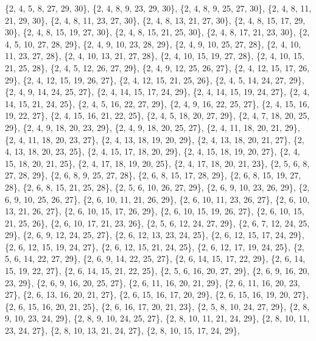 \documentclass[11pt,a4paper]{article}
\begin{document}
{\{2, 4, 5, 8, 27, 29, 30\}, \{2, 4, 8, 9, 23, 29, 30\}, \{2, 4, 8, 9, 25, 27, 30\}, \{2, 4, 8, 11, 21, 29, 30\}, \{2, 4, 8, 11, 23, 27, 30\},
\{2, 4, 8, 13, 21, 27, 30\}, \{2, 4, 8, 15, 17, 29, 30\}, \{2, 4, 8, 15, 19, 27, 30\}, \{2, 4, 8, 15, 21, 25, 30\}, \{2, 4, 8, 17, 21, 23, 30\},
\{2, 4, 5, 10, 27, 28, 29\}, \{2, 4, 9, 10, 23, 28, 29\}, \{2, 4, 9, 10, 25, 27, 28\}, \{2, 4, 10, 11, 23, 27, 28\}, \{2, 4, 10, 13, 21, 27, 28\},
\{2, 4, 10, 15, 19, 27, 28\}, \{2, 4, 10, 15, 21, 25, 28\}, \{2, 4, 5, 12, 26, 27, 29\}, \{2, 4, 9, 12, 25, 26, 27\}, \{2, 4, 12, 15, 17, 26, 29\},
\{2, 4, 12, 15, 19, 26, 27\}, \{2, 4, 12, 15, 21, 25, 26\}, \{2, 4, 5, 14, 24, 27, 29\}, \{2, 4, 9, 14, 24, 25, 27\}, \{2, 4, 14, 15, 17, 24, 29\},
\{2, 4, 14, 15, 19, 24, 27\}, \{2, 4, 14, 15, 21, 24, 25\}, \{2, 4, 5, 16, 22, 27, 29\}, \{2, 4, 9, 16, 22, 25, 27\}, \{2, 4, 15, 16, 19, 22, 27\},
\{2, 4, 15, 16, 21, 22, 25\}, \{2, 4, 5, 18, 20, 27, 29\}, \{2, 4, 7, 18, 20, 25, 29\}, \{2, 4, 9, 18, 20, 23, 29\}, \{2, 4, 9, 18, 20, 25, 27\},
\{2, 4, 11, 18, 20, 21, 29\}, \{2, 4, 11, 18, 20, 23, 27\}, \{2, 4, 13, 18, 19, 20, 29\}, \{2, 4, 13, 18, 20, 21, 27\}, \{2, 4, 13, 18, 20, 23, 25\},
\{2, 4, 15, 17, 18, 20, 29\}, \{2, 4, 15, 18, 19, 20, 27\}, \{2, 4, 15, 18, 20, 21, 25\}, \{2, 4, 17, 18, 19, 20, 25\}, \{2, 4, 17, 18, 20, 21, 23\},
\{2, 5, 6, 8, 27, 28, 29\}, \{2, 6, 8, 9, 25, 27, 28\}, \{2, 6, 8, 15, 17, 28, 29\}, \{2, 6, 8, 15, 19, 27, 28\}, \{2, 6, 8, 15, 21, 25, 28\},
\{2, 5, 6, 10, 26, 27, 29\}, \{2, 6, 9, 10, 23, 26, 29\}, \{2, 6, 9, 10, 25, 26, 27\}, \{2, 6, 10, 11, 21, 26, 29\}, \{2, 6, 10, 11, 23, 26, 27\},
\{2, 6, 10, 13, 21, 26, 27\}, \{2, 6, 10, 15, 17, 26, 29\}, \{2, 6, 10, 15, 19, 26, 27\}, \{2, 6, 10, 15, 21, 25, 26\}, \{2, 6, 10, 17, 21, 23, 26\},
\{2, 5, 6, 12, 24, 27, 29\}, \{2, 6, 7, 12, 24, 25, 29\}, \{2, 6, 9, 12, 24, 25, 27\}, \{2, 6, 12, 13, 23, 24, 25\}, \{2, 6, 12, 15, 17, 24, 29\},
\{2, 6, 12, 15, 19, 24, 27\}, \{2, 6, 12, 15, 21, 24, 25\}, \{2, 6, 12, 17, 19, 24, 25\}, \{2, 5, 6, 14, 22, 27, 29\}, \{2, 6, 9, 14, 22, 25, 27\},
\{2, 6, 14, 15, 17, 22, 29\}, \{2, 6, 14, 15, 19, 22, 27\}, \{2, 6, 14, 15, 21, 22, 25\}, \{2, 5, 6, 16, 20, 27, 29\}, \{2, 6, 9, 16, 20, 23, 29\},
\{2, 6, 9, 16, 20, 25, 27\}, \{2, 6, 11, 16, 20, 21, 29\}, \{2, 6, 11, 16, 20, 23, 27\}, \{2, 6, 13, 16, 20, 21, 27\}, \{2, 6, 15, 16, 17, 20, 29\},
\{2, 6, 15, 16, 19, 20, 27\}, \{2, 6, 15, 16, 20, 21, 25\}, \{2, 6, 16, 17, 20, 21, 23\}, \{2, 5, 8, 10, 24, 27, 29\}, \{2, 8, 9, 10, 23, 24, 29\},
\{2, 8, 9, 10, 24, 25, 27\}, \{2, 8, 10, 11, 21, 24, 29\}, \{2, 8, 10, 11, 23, 24, 27\}, \{2, 8, 10, 13, 21, 24, 27\}, \{2, 8, 10, 15, 17, 24, 29\},
}
\end{document}
